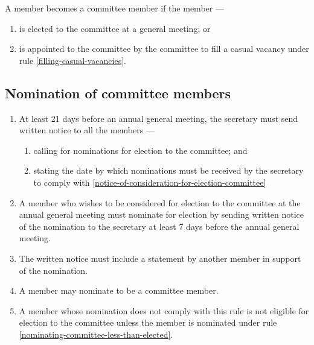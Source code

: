 \documentclass[../constitution.tex]{subfiles}
\begin{document}
A member becomes a committee member if the member ---

\begin{enumerate}

\item is elected to the committee at a general meeting; or
\item is appointed to the committee by the committee to fill a casual vacancy under rule \ref{filling-casual-vacancies}.
\end{enumerate}

\hypertarget{nomination-of-committee-members}{%
\subsection{Nomination of committee members}\label{nomination-of-committee-members}}

\begin{enumerate}

\item At least 21  days before an annual general meeting, the secretary must send written notice to all the members ---

  \begin{enumerate}
  
  \item calling for nominations for election to the committee; and
  \item stating the date by which nominations must be received by the secretary to comply with  \ref{notice-of-consideration-for-election-committee}
  \end{enumerate}
\item A member who wishes to be considered for election to the committee at the annual general meeting must nominate for election by sending written notice of the nomination to the secretary at least 7  days before the annual general meeting.  \label{notice-of-consideration-for-election-committee}
\item The written notice must include a statement by another member in support of the nomination.
\item A member may nominate to be a committee member. 
\item A member whose nomination does not comply with this rule is not eligible for election to the committee unless the member is nominated under rule \ref{nominating-committee-less-than-elected}. 
\end{enumerate}
\end{document}

